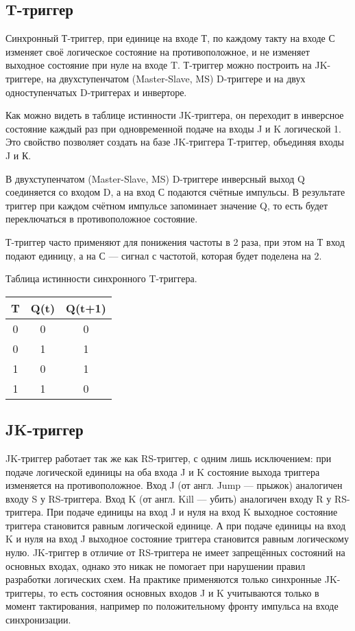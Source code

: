 \subsection*{T-триггер}

Синхронный Т-триггер, при единице на входе Т, по каждому такту на входе С изменяет своё логическое состояние на противоположное, и не изменяет выходное состояние при нуле на входе T. Т-триггер можно построить на JK-триггере, на двухступенчатом (Master-Slave, MS) D-триггере и на двух одноступенчатых D-триггерах и инверторе.

Как можно видеть в таблице истинности JK-триггера, он переходит в инверсное состояние каждый раз при одновременной подаче на входы J и K логической 1. Это свойство позволяет создать на базе JK-триггера Т-триггер, объединяя входы J и К.

В двухступенчатом (Master-Slave, MS) D-триггере инверсный выход Q соединяется со входом D, а на вход С подаются счётные импульсы. В результате триггер при каждом счётном импульсе запоминает значение Q, то есть будет переключаться в противоположное состояние.

Т-триггер часто применяют для понижения частоты в 2 раза, при этом на Т вход подают единицу, а на С --- сигнал с частотой, которая будет поделена на 2.

Таблица истинности синхронного T-триггера.

\begin{tabular}{|c|c|c|}
\hline	T	& Q(t)	& Q(t+1)	\\
\hline	0	& 0		& 0			\\
\hline	0	& 1		& 1			\\
\hline	1	& 0		& 1			\\
\hline	1	& 1		& 0			\\
\hline
\end{tabular}

\subsection*{JK-триггер}

JK-триггер работает так же как RS-триггер, с одним лишь исключением: при подаче логической единицы на оба входа J и K состояние выхода триггера изменяется на противоположное. Вход J (от англ. Jump --- прыжок) аналогичен входу S у RS-триггера. Вход K (от англ. Kill --- убить) аналогичен входу R у RS-триггера. При подаче единицы на вход J и нуля на вход K выходное состояние триггера становится равным логической единице. А при подаче единицы на вход K и нуля на вход J выходное состояние триггера становится равным логическому нулю. JK-триггер в отличие от RS-триггера не имеет запрещённых состояний на основных входах, однако это никак не помогает при нарушении правил разработки логических схем. На практике применяются только синхронные JK-триггеры, то есть состояния основных входов J и K учитываются только в момент тактирования, например по положительному фронту импульса на входе синхронизации.

